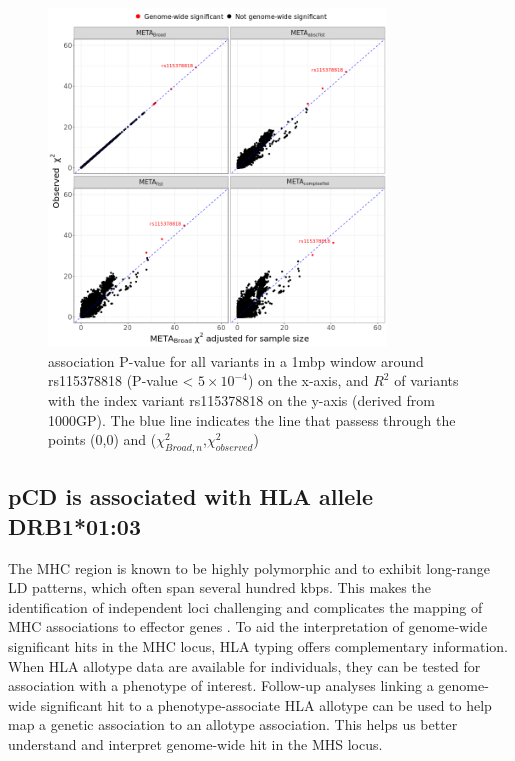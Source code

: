 \begin{figure}[H] 
  \centering    
  \includegraphics[width=0.8\textwidth]{Vector/meta_chisq_plot}
  \caption[Figure]{association P-value for all variants in a 1mbp window around rs115378818 (P-value < $5\times10^{-4}$) on the x-axis, and $R^{2}$ of variants with the index variant rs115378818 on the y-axis (derived from 1000GP). The blue line indicates the line that passess through the points (0,0) and ($\chi^{2}_{Broad,n}$,$\chi^{2}_{observed}$)}
  \label{fig:meta_def_comparison}
  \end{figure}
\subsection{pCD is associated with HLA allele DRB1*01:03}
The MHC region is known to be highly polymorphic and to exhibit long-range LD patterns, which often span several hundred kbps. This makes the identification of independent loci challenging and complicates the mapping of MHC associations to effector genes \cite{Matzaraki2017-za}. To aid the interpretation of genome-wide significant hits in the MHC locus, HLA typing offers complementary information. When HLA allotype data are available for individuals, they can be tested for association with a phenotype of interest. Follow-up analyses linking a genome-wide significant hit to a phenotype-associate HLA allotype can be used to help map a genetic association to an allotype association. This helps us better understand and interpret genome-wide hit in the MHS locus. 

